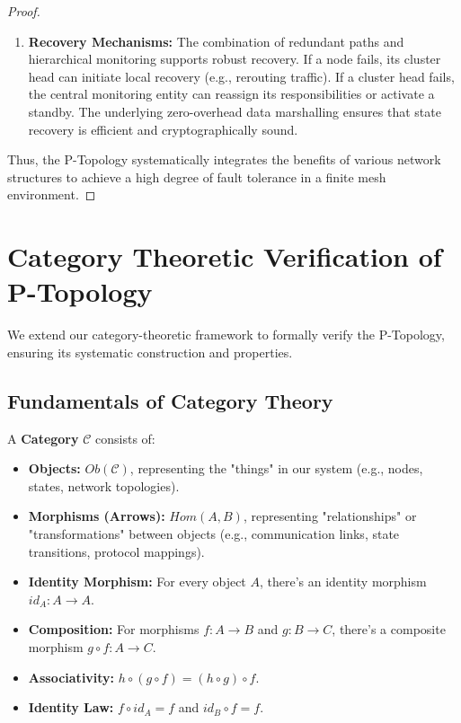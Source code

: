 \documentclass[10pt]{article}
\begin{document}
\begin{proof}
\begin{enumerate}
    \item \textbf{Recovery Mechanisms:} The combination of redundant paths and hierarchical monitoring supports robust recovery. If a node fails, its cluster head can initiate local recovery (e.g., rerouting traffic). If a cluster head fails, the central monitoring entity can reassign its responsibilities or activate a standby. The underlying zero-overhead data marshalling \cite{OBINexusDataMarshalling} ensures that state recovery is efficient and cryptographically sound.
\end{enumerate}
Thus, the P-Topology systematically integrates the benefits of various network structures to achieve a high degree of fault tolerance in a finite mesh environment.
\end{proof}

\section{Category Theoretic Verification of P-Topology}
We extend our category-theoretic framework to formally verify the P-Topology, ensuring its systematic construction and properties.

\subsection{Fundamentals of Category Theory}
A \textbf{Category} $\mathcal{C}$ consists of:
\begin{itemize}
    \item \textbf{Objects:} $Ob(\mathcal{C})$, representing the "things" in our system (e.g., nodes, states, network topologies).
    \item \textbf{Morphisms (Arrows):} $Hom(A, B)$, representing "relationships" or "transformations" between objects (e.g., communication links, state transitions, protocol mappings).
    \item \textbf{Identity Morphism:} For every object $A$, there's an identity morphism $id_A: A \to A$.
    \item \textbf{Composition:} For morphisms $f: A \to B$ and $g: B \to C$, there's a composite morphism $g \circ f: A \to C$.
    \item \textbf{Associativity:} $h \circ (g \circ f) = (h \circ g) \circ f$.
    \item \textbf{Identity Law:} $f \circ id_A = f$ and $id_B \circ f = f$.
\end{itemize}
\end{document}
